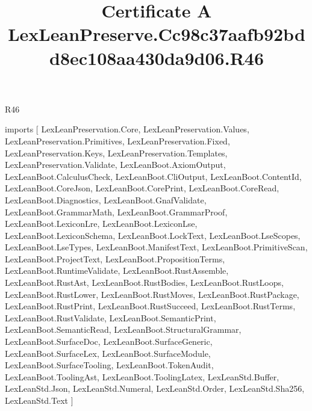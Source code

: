 \begin{lexlean}{R46}
\title{Certificate A LexLeanPreserve.Cc98c37aafb92bdd8ec108aa430da9d06.R46}
\begin{coremodule}
imports [
  LexLeanPreservation.Core,
  LexLeanPreservation.Values,
  LexLeanPreservation.Primitives,
  LexLeanPreservation.Fixed,
  LexLeanPreservation.Keys,
  LexLeanPreservation.Templates,
  LexLeanPreservation.Validate,
  LexLeanBoot.AxiomOutput,
  LexLeanBoot.CalculusCheck,
  LexLeanBoot.CliOutput,
  LexLeanBoot.ContentId,
  LexLeanBoot.CoreJson,
  LexLeanBoot.CorePrint,
  LexLeanBoot.CoreRead,
  LexLeanBoot.Diagnostics,
  LexLeanBoot.GnafValidate,
  LexLeanBoot.GrammarMath,
  LexLeanBoot.GrammarProof,
  LexLeanBoot.LexiconLre,
  LexLeanBoot.LexiconLse,
  LexLeanBoot.LexiconSchema,
  LexLeanBoot.LockText,
  LexLeanBoot.LseScopes,
  LexLeanBoot.LseTypes,
  LexLeanBoot.ManifestText,
  LexLeanBoot.PrimitiveScan,
  LexLeanBoot.ProjectText,
  LexLeanBoot.PropositionTerms,
  LexLeanBoot.RuntimeValidate,
  LexLeanBoot.RustAssemble,
  LexLeanBoot.RustAst,
  LexLeanBoot.RustBodies,
  LexLeanBoot.RustLoops,
  LexLeanBoot.RustLower,
  LexLeanBoot.RustMoves,
  LexLeanBoot.RustPackage,
  LexLeanBoot.RustPrint,
  LexLeanBoot.RustSucceed,
  LexLeanBoot.RustTerms,
  LexLeanBoot.RustValidate,
  LexLeanBoot.SemanticPrint,
  LexLeanBoot.SemanticRead,
  LexLeanBoot.StructuralGrammar,
  LexLeanBoot.SurfaceDoc,
  LexLeanBoot.SurfaceGeneric,
  LexLeanBoot.SurfaceLex,
  LexLeanBoot.SurfaceModule,
  LexLeanBoot.SurfaceTooling,
  LexLeanBoot.TokenAudit,
  LexLeanBoot.ToolingAst,
  LexLeanBoot.ToolingLatex,
  LexLeanStd.Buffer,
  LexLeanStd.Json,
  LexLeanStd.Numeral,
  LexLeanStd.Order,
  LexLeanStd.Sha256,
  LexLeanStd.Text
]


\end{coremodule}
\end{lexlean}
